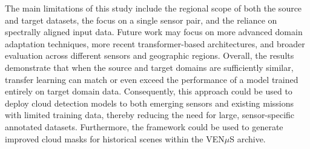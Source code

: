 The main limitations of this study include the regional scope of both the source and target datasets, the focus on a single sensor pair, and the reliance on spectrally aligned input data. Future work may focus on more advanced domain adaptation techniques, more recent transformer-based architectures, and broader evaluation across different sensors and geographic regions. Overall, the results demonstrate that when the source and target domains are sufficiently similar, transfer learning can match or even exceed the performance of a model trained entirely on target domain data. Consequently, this approach could be used to deploy cloud detection models to both emerging sensors and existing missions with limited training data, thereby reducing the need for large, sensor-specific annotated datasets. Furthermore, the framework could be used to generate improved cloud masks for historical scenes within the VEN$\mu$S archive.